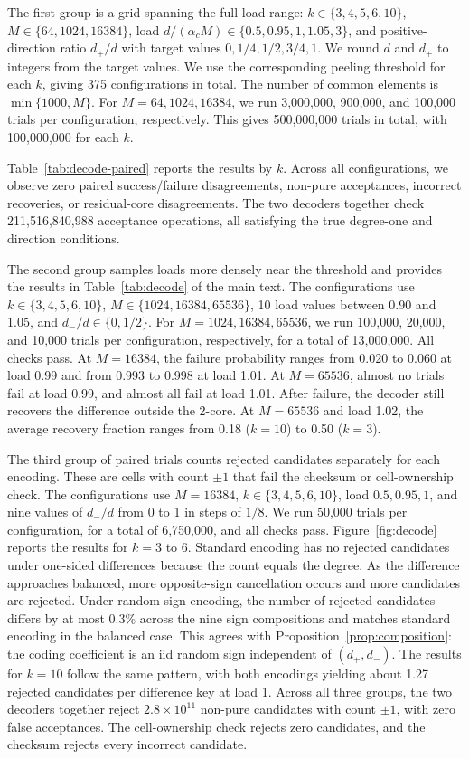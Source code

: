 The first group is a grid spanning the full load range: $k\in\{3,4,5,6,10\}$, $M\in\{64,1024,16384\}$, load $d/(\alpha_cM)\in\{0.5,0.95,1,1.05,3\}$, and positive-direction ratio $d_+/d$ with target values $0,1/4,1/2,3/4,1$. We round $d$ and $d_+$ to integers from the target values. We use the corresponding peeling threshold for each $k$, giving 375 configurations in total. The number of common elements is $\min\{1000,M\}$. For $M=64,1024,16384$, we run 3,000,000, 900,000, and 100,000 trials per configuration, respectively. This gives 500,000,000 trials in total, with 100,000,000 for each $k$.

Table~\ref{tab:decode-paired} reports the results by $k$. Across all configurations, we observe zero paired success/failure disagreements, non-pure acceptances, incorrect recoveries, or residual-core disagreements. The two decoders together check 211,516,840,988 acceptance operations, all satisfying the true degree-one and direction conditions.

The second group samples loads more densely near the threshold and provides the results in Table~\ref{tab:decode} of the main text. The configurations use $k\in\{3,4,5,6,10\}$, $M\in\{1024,16384,65536\}$, 10 load values between 0.90 and 1.05, and $d_-/d\in\{0,1/2\}$. For $M=1024,16384,65536$, we run 100,000, 20,000, and 10,000 trials per configuration, respectively, for a total of 13,000,000. All checks pass. At $M=16384$, the failure probability ranges from 0.020 to 0.060 at load 0.99 and from 0.993 to 0.998 at load 1.01. At $M=65536$, almost no trials fail at load 0.99, and almost all fail at load 1.01. After failure, the decoder still recovers the difference outside the 2-core. At $M=65536$ and load 1.02, the average recovery fraction ranges from 0.18 ($k=10$) to 0.50 ($k=3$).

The third group of paired trials counts rejected candidates separately for each encoding. These are cells with count $\pm1$ that fail the checksum or cell-ownership check. The configurations use $M=16384$, $k\in\{3,4,5,6,10\}$, load $0.5,0.95,1$, and nine values of $d_-/d$ from 0 to 1 in steps of $1/8$. We run 50,000 trials per configuration, for a total of 6,750,000, and all checks pass. Figure~\ref{fig:decode} reports the results for $k=3$ to 6. Standard encoding has no rejected candidates under one-sided differences because the count equals the degree. As the difference approaches balanced, more opposite-sign cancellation occurs and more candidates are rejected. Under random-sign encoding, the number of rejected candidates differs by at most 0.3\% across the nine sign compositions and matches standard encoding in the balanced case. This agrees with Proposition~\ref{prop:composition}: the coding coefficient is an iid random sign independent of $(d_+,d_-)$. The results for $k=10$ follow the same pattern, with both encodings yielding about 1.27 rejected candidates per difference key at load 1. Across all three groups, the two decoders together reject $2.8\times10^{11}$ non-pure candidates with count $\pm1$, with zero false acceptances. The cell-ownership check rejects zero candidates, and the checksum rejects every incorrect candidate.

